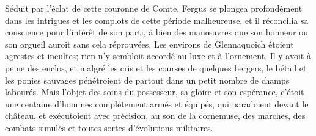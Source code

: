 Séduit par l'éclat de cette couronne de Comte, Fergus se plongea profondément dans les intrigues et les complots de cette période malheureuse, et il réconcilia sa conscience pour l'intérêt de son parti, à bien des manœuvres que son honneur ou son orgueil auroit sans cela réprouvées.
Les environs de Glennaquoich étoient agrestes et incultes; rien n'y sembloit accordé au luxe et à l'ornement. Il y avoit à peine des enclos, et malgré les cris et les courses de quelques bergers, le bétail et les\setcounter{page}{119} ponies sauvages pénétroient de partout dans un petit nombre de champs labourés. Mais l'objet des soins du possesseur, sa gloire et son espérance, c'étoit une centaine d'hommes complétement armés et équipés, qui paradoient devant le château, et exécutoient avec précision, au son de la cornemuse, des marches, des combats simulés et toutes sortes d'évolutions militaires.
